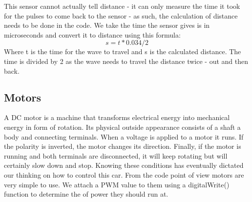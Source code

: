 \documentclass[conference]{IEEEtran}
\begin{document}
This sensor cannot actually tell distance - it can only measure the time it took for the pulses to come back to the sensor - as such, the calculation of distance needs to be done in the code.
We take the time the sensor gives is in microseconds and convert it to distance using this formula:
\begin{equation}
	s=t*0.034/2
\end{equation}
Where t is the time for the wave to travel and s is the calculated distance. The time is divided by 2 as the wave needs to travel the distance twice - out and then back.

\subsection{Motors}
A DC motor is a machine that transforms electrical energy into mechanical energy in form of rotation. Its physical outside appearance consists of a shaft a body and connecting terminals. 
When a voltage is applied to a motor it runs. If the polarity is inverted, the motor changes its direction. Finally, if the motor is running and both terminals are disconnected, it will keep rotating but will certainly slow down and stop. Knowing these conditions has eventually dictated our thinking on how to control this car.
From the code point of view motors are very simple to use. We attach a PWM value to them using a digitalWrite() function to determine the \text{\%} of power they should run at.
\end{document}
